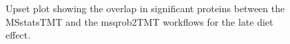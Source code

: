 \documentclass[
  letterpaper,
  DIV=11,
  numbers=noendperiod]{scrartcl}
\begin{document}
\begin{figure}[H]


\caption{\label{fig-Upset-late}Upset plot showing the overlap in
significant proteins between the MSstatsTMT and the msqrob2TMT workflows
for the late diet effect.}

\end{figure}%
\end{document}
